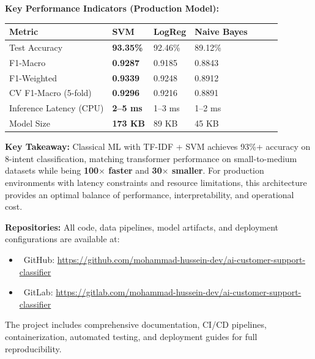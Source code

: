 \documentclass[12pt,a4paper]{article}
\renewcommand{\arraystretch}{1.5}
\newcommand{\goldrowcolors}{%
    \rowcolors{2}{bgCard}{bgDark}%
}
\newcommand{\tableheader}[1]{\textcolor{accentGold}{\textbf{#1}}}
\newcommand{\tablehdrrow}{\rowcolor{accentCard}}
\begin{document}
\begin{resultbox}
\textbf{Key Performance Indicators (Production Model):}
\begin{center}
\goldrowcolors
\renewcommand{\arraystretch}{1.5}
\begin{tabular}{@{}L{5cm} V C{3cm} V C{3cm} V C{3cm}@{}}
\toprule
\tablehdrrow
\tableheader{Metric} & \tableheader{SVM} & \tableheader{LogReg} & \tableheader{Naive Bayes} \\
\midrule
Test Accuracy & \textbf{93.35\%} & 92.46\% & 89.12\% \\
F1-Macro & \textbf{0.9287} & 0.9185 & 0.8843 \\
F1-Weighted & \textbf{0.9339} & 0.9248 & 0.8912 \\
CV F1-Macro (5-fold) & \textbf{0.9296} & 0.9216 & 0.8891 \\
Inference Latency (CPU) & \textbf{2--5 ms} & 1--3 ms & 1--2 ms \\
Model Size & \textbf{173 KB} & 89 KB & 45 KB \\
\bottomrule
\end{tabular}
\end{center}
\end{resultbox}

\begin{tipbox}
\textbf{Key Takeaway:} Classical ML with TF-IDF + SVM achieves 93\%+ accuracy on 8-intent classification, matching transformer performance on small-to-medium datasets while being \textbf{100$\times$ faster} and \textbf{30$\times$ smaller}. For production environments with latency constraints and resource limitations, this architecture provides an optimal balance of performance, interpretability, and operational cost.
\end{tipbox}

\begin{bottomnote}
\textbf{Repositories:} All code, data pipelines, model artifacts, and deployment configurations are available at:
\begin{itemize}[leftmargin=*]
    \item {}~GitHub: \url{https://github.com/mohammad-hussein-dev/ai-customer-support-classifier}
    \item {}~GitLab: \url{https://gitlab.com/mohammad-hussein-dev/ai-customer-support-classifier}
\end{itemize}
The project includes comprehensive documentation, CI/CD pipelines, containerization, automated testing, and deployment guides for full reproducibility.
\end{bottomnote}
\end{document}
